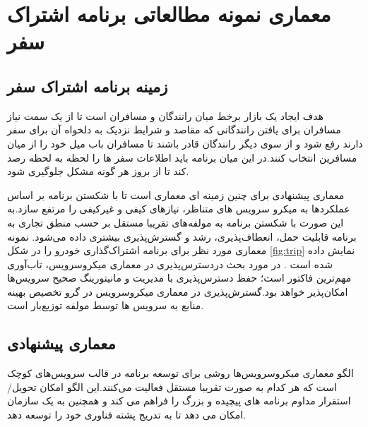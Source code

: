 \chapter{معماری نمونه مطالعاتی برنامه اشتراک سفر}

\section{زمینه برنامه اشتراک سفر}
هدف ایجاد یک بازار برخط میان رانندگان و مسافران است تا از یک سمت نیاز مسافران برای یافتن رانندگانی که مقاصد و شرایط نزدیک به دلخواه آن برای سفر دارند رفع شود و از سوی دیگر رانندگان قادر باشند تا مسافران باب میل خود را از میان مسافرین انتخاب کنند.در این میان برنامه باید اطلاعات سفر ها را لحظه به لحظه رصد کند تا از بروز هر گونه مشکل جلوگیری شود.

معماری پیشنهادی برای چنین زمینه ای معماری  
\cite{micro_a}
است تا با شکستن برنامه بر اساس عملکرد‌ها به میکرو سرویس های متناظر، نیازهای کیفی و غیرکیفی را مرتفع سازد.به این صورت با شکستن برنامه به مولفه‌های تقریبا مستقل بر حسب منطق تجاری به برنامه قابلیت حمل، انعطاف‌پذیری، رشد و گسترش‌پذیری بیشتری داده می‌شود. نمونه معماری مورد نظر برای برنامه اشتراک‌گذاری خودرو را در شکل \ref{fig:trip} نمایش داده شده است \cite{micro_carpooling} .
در مورد بحث دردسترس‌پذیری در معماری میکروسرویس، تاب‌‌آوری مهم‌ترین فاکتور است؛ حفظ دسترس‌پذیری با مدیریت و مانیتورینگ صحیح سرویس‌ها امکان‌پذیر خواهد بود.گسترش‌پذیری در معماری میکروسرویس در گرو تخصیص بهینه منابع به سرویس ها توسط مولفه توزیع‌بار است.

\section{معماری پیشنهادی}

الگو معماری میکرو‌سرویس‌ها روشی برای توسعه برنامه در قالب سرویس‌های کوچک است که هر کدام به صورت تقریبا مستقل فعالیت می‌کنند.این الگو امکان تحویل/استقرار مداوم برنامه های پیچیده و بزرگ را فراهم می کند و همچنین به یک سازمان امکان می دهد تا به تدریج پشته فناوری خود را توسعه دهد.

